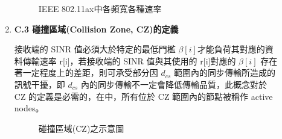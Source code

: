 \documentclass[12pt,a4paper]{article}
\begin{document}
\begin{description}
\begin{enumerate}
\begin{figure}[hbt]
    \begin{center}
    \caption{IEEE 802.11ax中各頻寬各種速率} \label{fig:IEEE802.11ax_band_rate}
    \vspace{-0.2cm}
    \end{center}
    \end{figure}
\vspace{2cm}


\item [\bf ]{\textbf{\Kai C.3 碰撞區域(Collision Zone, CZ)的定義  }}\\
\vspace{-2mm}

接收端的 SINR 值必須大於特定的最低門檻 $\beta[i]$才能負荷其對應的資料傳輸速率 r[i]，若接收端的 SINR 值與其使用的 r[i]對應的 $\beta[i]$ 存在著一定程度上的差距，則可承受部分因 $d_{cs}$ 範圍內的同步傳輸所造成的訊號干擾，即 $d_{cs}$ 內的同步傳輸不一定會降低傳輸品質，此概念對於 CZ 的定義是必需的，在\cite{tn00_cali}中，所有位於 CZ 範圍內的節點被稱作 active nodes。 

\begin{figure}[hbt]
\begin{center}
\caption{碰撞區域(CZ)之示意圖} \label{fig:czone}
\vspace{-0.2cm}
\end{center}
\end{figure}
\vspace{1cm}


\end{enumerate}
\end{description}
\end{document}

